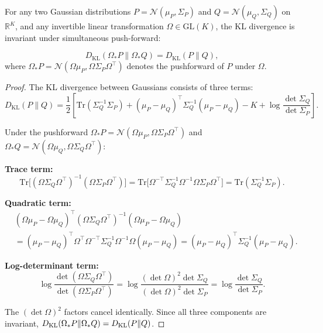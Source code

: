 \documentclass[twoside,11pt]{article}
\begin{document}
\begin{theorem}
\label{thm:glk_invariance}
For any two Gaussian distributions $P = \mathcal{N}(\mu_P, \Sigma_P)$ and $Q = \mathcal{N}(\mu_Q, \Sigma_Q)$ on $\mathbb{R}^K$, and any invertible linear transformation $\Omega \in \mathrm{GL}(K)$, the KL divergence is invariant under simultaneous push-forward:

\begin{equation}
D_{\mathrm{KL}}(\Omega_* P \| \Omega_* Q) = D_{\mathrm{KL}}(P \| Q),
\label{eq:glk_invariance}
\end{equation}
where $\Omega_* P = \mathcal{N}(\Omega\mu_P, \Omega\Sigma_P\Omega^\top)$ denotes the pushforward of $P$ under $\Omega$.
\end{theorem}

\begin{proof}
The KL divergence between Gaussians consists of three terms:
\begin{equation}
D_{\mathrm{KL}}(P \| Q) = \frac{1}{2}\left[\mathrm{Tr}(\Sigma_Q^{-1}\Sigma_P) + (\mu_P - \mu_Q)^\top \Sigma_Q^{-1}(\mu_P - \mu_Q) - K + \log\frac{\det\Sigma_Q}{\det\Sigma_P}\right].
\end{equation}

Under the pushforward $\Omega_* P = \mathcal{N}(\Omega\mu_P, \Omega\Sigma_P\Omega^\top)$ and $\Omega_* Q = \mathcal{N}(\Omega\mu_Q, \Omega\Sigma_Q\Omega^\top)$:

\textbf{Trace term:}
\begin{equation}
\mathrm{Tr}\big[(\Omega\Sigma_Q\Omega^\top)^{-1}(\Omega\Sigma_P\Omega^\top)\big] = \mathrm{Tr}\big[\Omega^{-\top}\Sigma_Q^{-1}\Omega^{-1}\Omega\Sigma_P\Omega^\top\big] = \mathrm{Tr}(\Sigma_Q^{-1}\Sigma_P). 
\end{equation}

\textbf{Quadratic term:}
\begin{align}
&(\Omega\mu_P - \Omega\mu_Q)^\top (\Omega\Sigma_Q\Omega^\top)^{-1} (\Omega\mu_P - \Omega\mu_Q) \nonumber\\
&= (\mu_P - \mu_Q)^\top \Omega^\top \Omega^{-\top}\Sigma_Q^{-1}\Omega^{-1}\Omega (\mu_P - \mu_Q) = (\mu_P - \mu_Q)^\top \Sigma_Q^{-1}(\mu_P - \mu_Q). 
\end{align}

\textbf{Log-determinant term:}
\begin{equation}
\log\frac{\det(\Omega\Sigma_Q\Omega^\top)}{\det(\Omega\Sigma_P\Omega^\top)} = \log\frac{(\det\Omega)^2 \det\Sigma_Q}{(\det\Omega)^2 \det\Sigma_P} = \log\frac{\det\Sigma_Q}{\det\Sigma_P}. 
\end{equation}

The $(\det\Omega)^2$ factors cancel identically. Since all three components are invariant, $\\ D_{\mathrm{KL}}(\Omega_* P \| \Omega_* Q) = D_{\mathrm{KL}}(P \| Q)$.
\end{proof}
\end{document}
